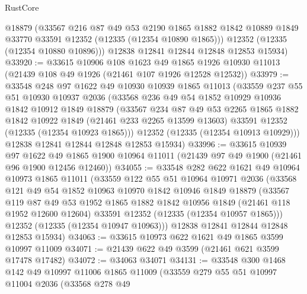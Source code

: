 \begin{lexlean}{RustCore}
\begin{coremodule}
        @18879
        (@33567
          @216
          @87
          @49
          @53
          @2190
          @1865
          @1882
          @1842
          @10889
          @1849
          @33770
          @33591
          @12352
          (@12335 (@12354 @10890 @1865)))
        @12352
        (@12335 (@12354 @10880 @10896)))
      @12838
      @12841
      @12844
      @12848
      @12853
      @15934)
@33920 := @33615
    @10906
    @108
    @1623
    @49
    @1865
    @1926
    @10930
    @11013
    (@21439 @108 @49 @1926 (@21461 @107 @1926 @12528 @12532))
@33979 := @33548
    @248
    @97
    @1622
    @49
    @10930
    @10939
    @1865
    @11013
    (@33559
      @237
      @55
      @51
      @10930
      @10937
      @2036
      (@33568
        @236
        @49
        @54
        @1852
        @10929
        @10936
        @1842
        @10912
        @1849
        @18879
        (@33567
          @234
          @87
          @49
          @53
          @2265
          @1865
          @1882
          @1842
          @10922
          @1849
          (@21461 @233 @2265 @13599 @13603)
          @33591
          @12352
          (@12335 (@12354 @10923 @1865)))
        @12352
        (@12335 (@12354 @10913 @10929)))
      @12838
      @12841
      @12844
      @12848
      @12853
      @15934)
@33996 := @33615
    @10939
    @97
    @1622
    @49
    @1865
    @1900
    @10964
    @11011
    (@21439 @97 @49 @1900 (@21461 @96 @1900 @12456 @12460))
@34055 := @33548
    @282
    @622
    @1621
    @49
    @10964
    @10973
    @1865
    @11011
    (@33559
      @122
      @55
      @51
      @10964
      @10971
      @2036
      (@33568
        @121
        @49
        @54
        @1852
        @10963
        @10970
        @1842
        @10946
        @1849
        @18879
        (@33567
          @119
          @87
          @49
          @53
          @1952
          @1865
          @1882
          @1842
          @10956
          @1849
          (@21461 @118 @1952 @12600 @12604)
          @33591
          @12352
          (@12335 (@12354 @10957 @1865)))
        @12352
        (@12335 (@12354 @10947 @10963)))
      @12838
      @12841
      @12844
      @12848
      @12853
      @15934)
@34063 := @33615 @10973 @622 @1621 @49 @1865 @3599 @10997 @11009
@34071 := @21439 @622 @49 @3599 (@21461 @621 @3599 @17478 @17482)
@34072 := @34063 @34071
@34131 := @33548
    @300
    @1468
    @142
    @49
    @10997
    @11006
    @1865
    @11009
    (@33559
      @279
      @55
      @51
      @10997
      @11004
      @2036
      (@33568
        @278
        @49

\end{coremodule}
\end{lexlean}

